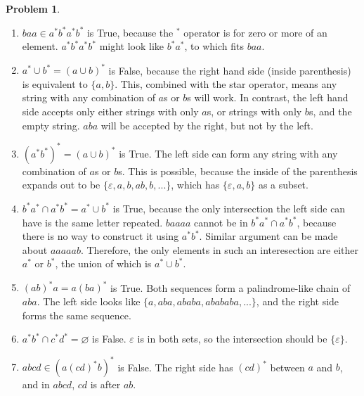 \documentclass[11pt]{article}
\theoremstyle{definition}
\theoremstyle{case}
\theoremstyle{theorem}
\newtheorem{prob}{Problem}
\begin{document}
\newpage

\begin{prob}\end{prob}

\begin{enumerate}[label=(\alph*)]

\item
$baa \in a^*b^*a^*b^*$ is True, because the $^*$ operator is for zero or more of an element. 
$a^*b^*a^*b^*$ might look like $b^*a^*$, to which fits $baa$.

\item
$a^* \cup b^* = (a \cup b)^*$ is False, because the right hand side (inside parenthesis) is equivalent to $\{a, b\}$.
This, combined with the star operator, means any string with any combination of $a$s or $b$s will work.
In contrast, the left hand side accepts only either strings with only $a$s, or strings with only $b$s, and the empty string.
$aba$ will be accepted by the right, but not by the left.

\item
$(a^*b^*)^* = (a \cup b)^*$ is True. The left side can form any string with any combination of $a$s or $b$s.
This is possible, because the inside of the parenthesis expands out to be $\{\varepsilon, a, b, ab, b, ...\}$,
which has $\{\varepsilon, a, b\}$ as a subset.

\item
$b^*a^* \cap a^*b^* = a^* \cup b^*$ is True, because the only intersection the left side can have is
the same letter repeated. $baaaa$ cannot be in $b^*a^* \cap a^*b^*$, because there is no way to construct it
using $a^*b^*$. Similar argument can be made about $aaaaab$. Therefore, the only elements in such an
interesection are either $a^*$ or $b^*$, the union of which is $a^* \cup b^*$.

\item
$(ab)^*a = a(ba)^*$ is True. Both sequences form a palindrome-like chain of $aba$. The left side looks
like $\{a, aba, ababa, abababa, ... \}$, and the right side forms the same sequence. 

\item
$a^*b^* \cap c^*d^* = \varnothing$ is False. $\varepsilon$ is in both sets, so the intersection should be 
$\{\varepsilon\}$.

\item
$abcd \in (a (cd)^* b)^*$ is False. The right side has $(cd)^*$ between $a$ and $b$, and in $abcd$, $cd$ is after $ab$. 
   
\end{enumerate}
\end{document}
